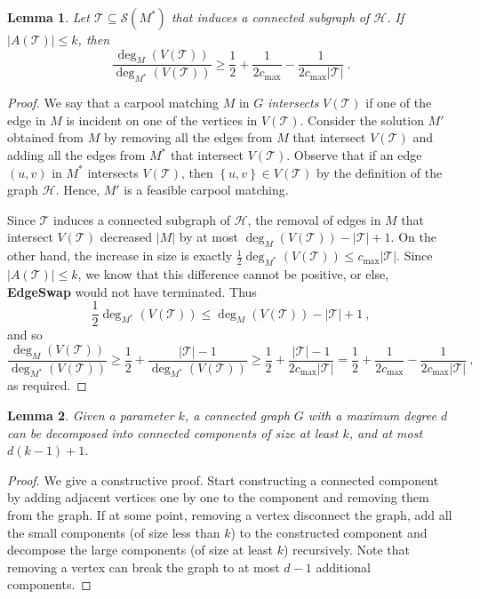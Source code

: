 \documentclass[11pt]{article}
\newtheorem{lemma}{Lemma}
\newcommand{\set}[1]{\left\{ #1 \right\}}
\newcommand{\abs}[1]{\left| #1 \right|}
\newcommand{\half}{\frac{1}{2}}
\newcommand{\inv}[1]{\frac{1}{#1}}
\newcommand{\cmax}{c_{\max}}
\newcommand{\calS}{\mathcal{S}}
\newcommand{\calT}{\mathcal{T}}
\newcommand{\calH}{\mathcal{H}}
\begin{document}
\begin{lemma}
\label{lemma:r}
Let $\calT \subseteq \calS(M^*)$ that induces a connected subgraph of
$\calH$.  If $\abs{A(\calT)} \leq k$, then
\[
\frac{\deg_M(V(\calT))}{\deg_{M^*}(V(\calT))} 
\geq \half + \inv{2\cmax} - \inv{2\cmax\abs{\calT}}
~.
\]
\end{lemma}
\begin{proof}
We say that a carpool matching $M$ in $G$ \emph{intersects} $V(\calT)$
if one of the edge in $M$ is incident on one of the vertices in
$V(\calT)$.
%
Consider the solution $M'$ obtained from $M$ by removing all the edges
from $M$ that intersect $V(\calT)$ and adding all the edges from $M^*$
that intersect $V(\calT)$.  Observe that if an edge $(u,v)$ in $M^*$
intersects $V(\calT)$, then $\set{u,v} \in V(\calT)$ by the definition
of the graph $\calH$.  Hence, $M'$ is a feasible carpool matching.

Since $\calT$ induces a connected subgraph of $\calH$, the removal of
edges in $M$ that intersect $V(\calT)$ decreased $\abs{M}$ by at most
$\deg_M(V(\calT)) - \abs{\calT} + 1$.
%
On the other hand, the increase in size is exactly $\half
\deg_{M^*}(V(\calT)) \leq \cmax \abs{\calT}$.
%
Since $\abs{A(\calT)} \leq k$, we know that this difference cannot be
positive, or else, \textbf{EdgeSwap} would not have terminated.  Thus
\[
\half \deg_{M^*}(V(\calT)) \leq \deg_M(V(\calT)) - \abs{\calT} + 1
~,
\]
and so
\[
\frac{\deg_M(V(\calT))}{\deg_{M^*}(V(\calT))}
\geq \half + \frac{\abs{\calT} - 1}{\deg_{M^*}(V(\calT))}
\geq \half + \frac{\abs{\calT} - 1}{2\cmax \abs{\calT}}
=    \half + \inv{2\cmax} - \inv{2\cmax \abs{\calT}}
~,
\]
as required.
\end{proof}


\iffalse %

\begin{lemma}
Given a parameter $k$, a connected graph $G$ with a maximum degree $d$
can be decomposed into connected components of size at least $k$, and
at most $d(k-1) + 1$.
\end{lemma}

\begin{proof}
We give a constructive proof.  Start constructing a connected
component by adding adjacent vertices one by one to the component and
removing them from the graph.  If at some point, removing a vertex
disconnect the graph, add all the small components (of size less than
$k$) to the constructed component and decompose the large components
(of size at least $k$) recursively.  Note that removing a vertex can
break the graph to at most $d - 1$ additional components.
\end{proof}
\end{document}
